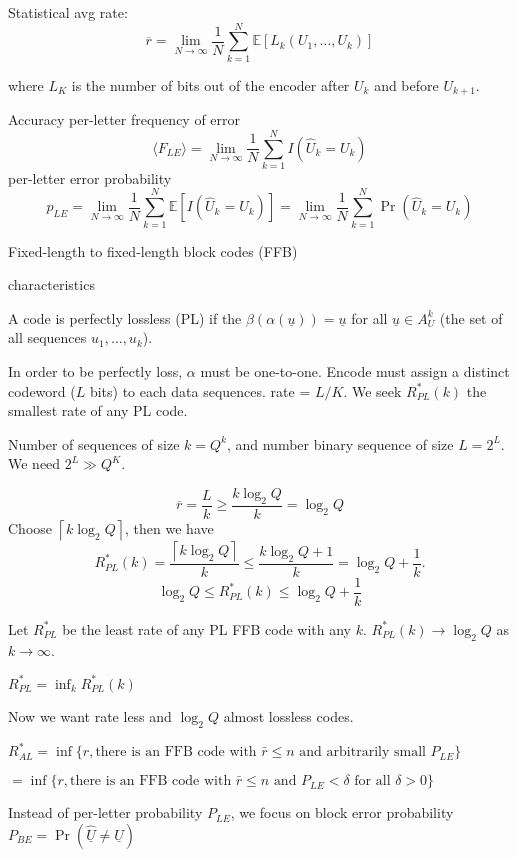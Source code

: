 \documentclass{report}
\theoremstyle{definition}
\theoremstyle{remark}
\numberwithin{equation}{section}
\begin{document}
  Statistical avg rate:
  \[
    \overline{r} = \lim_{N \to \infty} \frac{1}{N}\sum_{k=1}^N \mathbb{E}[L_k(U_1, \ldots, U_k)]
  \]

  where $L_K$ is the number of bits out of the encoder after $U_k$ and before $U_{k+1}$.

Accuracy
per-letter frequency of error \[
  \langle F_{LE}\rangle = \lim_{N \to \infty} \frac{1}{N} \sum_{k=1}^N I(\hat{U}_k=U_k)
\]
per-letter error probability \[
  p_{LE} = \lim_{N \to \infty} \frac{1}{N} \sum_{k=1}^N \mathbb{E}[I(\hat{U}_k=U_k)] = \lim_{N \to \infty} \frac{1}{N} \sum_{k=1}^N \Pr(\hat{U}_k=U_k)
\]

Fixed-length to fixed-length block codes (FFB)


characteristics

A code is perfectly lossless (PL) if the $\beta(\alpha(\underline{u})) = \underline{u}$ for all $\underline{u} \in A_U^k$ (the set of all sequences $u_1, \ldots, u_k$).

In order to be perfectly loss, $\alpha$ must be one-to-one. Encode must assign a distinct codeword ($L$ bits) to each data sequences. rate = $L/K$.
We seek $R^*_{PL}(k)$ the smallest rate of any PL code.

Number of sequences of size $k = Q^k$, and number binary sequence of size $L = 2^L$. We need $2^L \gg Q^K$.

\[
\overline{r} = \frac{L}{k} \geq \frac{k\log_2Q}{k} = \log_2Q
\]
Choose $\left\lceil k\log_2Q\right\rceil$, then we have \[
  R^*_{PL}(k) = \frac{\left\lceil k\log_2Q\right\rceil}{k} \leq\frac{k\log_2Q + 1}{k} =\log_2 Q + \frac{1}{k}.
\]
\[
  \log_2 Q \leq R^*_{PL}(k) \leq \log_2 Q + \frac{1}{k}
\]

Let $R^*_{PL}$ be the least rate of any PL FFB code with any $k$. 
$R^*_{PL}(k) \to \log_2 Q$ as $k \to \infty$.

$R^*_{PL} = \inf_k R^*_{PL}(k)$

Now we want rate less and $\log_2 Q$ almost lossless codes.

$R^*_{AL} =  \inf \{r, \text{there is an FFB code with $\bar{r} \leq n$ and arbitrarily small $P_{LE}$}\}$

$ = \inf \{r, \text{there is an FFB code with $\bar{r} \leq n$ and $P_{LE} < \delta$ for all $\delta > 0$}\}$

Instead of per-letter probability $P_{LE}$, we focus on block error probability $P_{BE} = \Pr(\underline{\hat{U}} \neq \underline{U})$
\end{document}
